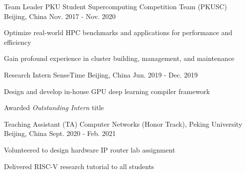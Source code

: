 \begin{cventries}
  \cventry
    {Team Leader} %
    {PKU Student Supercomputing Competition Team (PKUSC)} %
    {Beijing, China} %
    {Nov. 2017 - Nov. 2020} %
    {
      \begin{cvitems} %
        \item {Optimize real-world HPC benchmarks and applications for performance and efficiency}
        \item {Gain profound experience in cluster building, management, and maintenance}
      \end{cvitems}
    }

\end{cventries}


\begin{cventries}
    \cventry
    {Research Intern}
    {SenseTime}
    {Beijing, China}
    {Jun. 2019 - Dec. 2019}
    {
        \begin{cvitems}
        \item {Design and develop in-house GPU deep learning compiler framework}
        \item {Awarded \textit{Outstanding Intern} title}
        \end{cvitems}
    }
\end{cventries}


\begin{cventries}
    \cventry
    {Teaching Assistant (TA)}
    {Computer Networks (Honor Track), Peking University}
    {Beijing, China}
    {Sept. 2020 - Feb. 2021}
    {
        \begin{cvitems}
        \item {Volunteered to design hardware IP router lab assignment}
        \item {Delivered RISC-V research tutorial to all students}
        \end{cvitems}
    }
\end{cventries}
